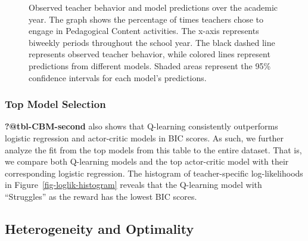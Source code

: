 \documentclass[
  number,
  preprint,
  3p,
  onecolumn]{elsarticle}
\begin{document}
\begin{figure}


\caption{\label{fig-action-percentages-2}Observed teacher behavior and
model predictions over the academic year. The graph shows the percentage
of times teachers chose to engage in Pedagogical Content activities. The
x-axis represents biweekly periods throughout the school year. The black
dashed line represents observed teacher behavior, while colored lines
represent predictions from different models. Shaded areas represent the
95\% confidence intervals for each model's predictions.}

\end{figure}%

\subsubsection{Top Model Selection}\label{top-model-selection}

\textbf{?@tbl-CBM-second} also shows that Q-learning consistently
outperforms logistic regression and actor-critic models in BIC scores.
As such, we further analyze the fit from the top models from this table
to the entire dataset. That is, we compare both Q-learning models and
the top actor-critic model with their corresponding logistic regression.
The histogram of teacher-specific log-likelihoods in
Figure~\ref{fig-loglik-histogram} reveals that the Q-learning model with
``Struggles'' as the reward has the lowest BIC scores.

\subsection{Heterogeneity and
Optimality}\label{heterogeneity-and-optimality}
\end{document}
